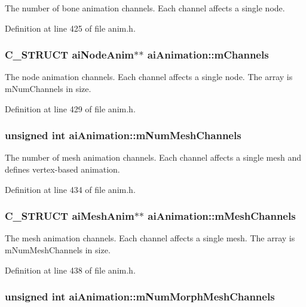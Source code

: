 The number of bone animation channels. Each channel affects a single node. 

Definition at line 425 of file anim.h.\hypertarget{structai_animation_89244bb68b725ffbb85137174c28e757}{
\subsubsection[mChannels]{\setlength{\rightskip}{0pt plus 5cm}C\_\-STRUCT {\bf aiNodeAnim}$\ast$$\ast$ {\bf aiAnimation::mChannels}}}
\label{structai_animation_89244bb68b725ffbb85137174c28e757}


The node animation channels. Each channel affects a single node. The array is mNumChannels in size. 

Definition at line 429 of file anim.h.\hypertarget{structai_animation_c43aacd8502020174e553501f0b6bf5f}{
\subsubsection[mNumMeshChannels]{\setlength{\rightskip}{0pt plus 5cm}unsigned int {\bf aiAnimation::mNumMeshChannels}}}
\label{structai_animation_c43aacd8502020174e553501f0b6bf5f}


The number of mesh animation channels. Each channel affects a single mesh and defines vertex-based animation. 

Definition at line 434 of file anim.h.\hypertarget{structai_animation_f05138121dbde8b31aa031505b454c85}{
\subsubsection[mMeshChannels]{\setlength{\rightskip}{0pt plus 5cm}C\_\-STRUCT {\bf aiMeshAnim}$\ast$$\ast$ {\bf aiAnimation::mMeshChannels}}}
\label{structai_animation_f05138121dbde8b31aa031505b454c85}


The mesh animation channels. Each channel affects a single mesh. The array is mNumMeshChannels in size. 

Definition at line 438 of file anim.h.\hypertarget{structai_animation_ed9aa50bdf38c9f6064f79f5aab38d59}{
\subsubsection[mNumMorphMeshChannels]{\setlength{\rightskip}{0pt plus 5cm}unsigned int {\bf aiAnimation::mNumMorphMeshChannels}}}
\label{structai_animation_ed9aa50bdf38c9f6064f79f5aab38d59}


